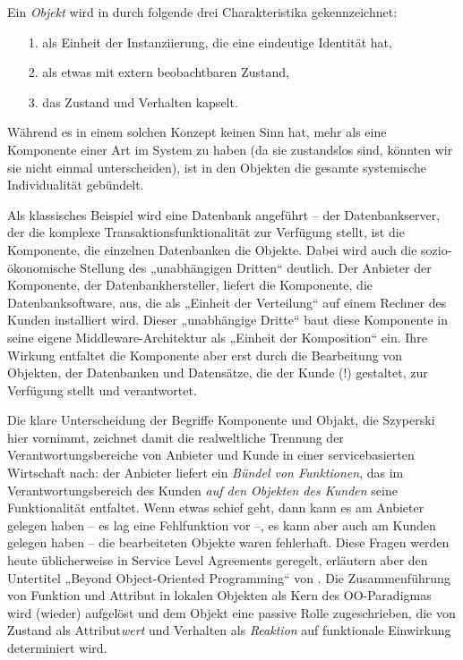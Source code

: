\documentclass[12pt,a4paper]{article}
\begin{document}
Ein \emph{Objekt} wird in \cite{Szyperski2002} durch folgende drei
Charakteristika gekennzeichnet:
\begin{itemize}
\item [1.] als Einheit der Instanziierung, die eine eindeutige Identität hat, 
\item [2.] als etwas mit extern beobachtbaren Zustand,
\item [3.] das Zustand und Verhalten kapselt.
\end{itemize}
Während es in einem solchen Konzept keinen Sinn hat, mehr als eine Komponente
einer Art im System zu haben (da sie zustandslos sind, könnten wir sie nicht
einmal unterscheiden), ist in den Objekten die gesamte systemische
Individualität gebündelt.

Als klassisches Beispiel wird eine Datenbank angeführt -- der Datenbankserver,
der die komplexe Transaktionsfunktionalität zur Verfügung stellt, ist die
Komponente, die einzelnen Datenbanken die Objekte.  Dabei wird auch die
sozio-ökonomische Stellung des „unabhängigen Dritten“ deutlich. Der Anbieter
der Komponente, der Datenbankhersteller, liefert die Komponente, die
Datenbanksoftware, aus, die als „Einheit der Verteilung“ auf einem Rechner des
Kunden installiert wird. Dieser „unabhängige Dritte“ baut diese Komponente in
seine eigene Middleware-Architektur als „Einheit der Komposition“ ein.  Ihre
Wirkung entfaltet die Komponente aber erst durch die Bearbeitung von Objekten,
der Datenbanken und Datensätze, die der Kunde (!) gestaltet, zur Verfügung
stellt und verantwortet.

Die klare Unterscheidung der Begriffe Komponente und Objakt, die Szyperski
hier vornimmt, zeichnet damit die realweltliche Trennung der
Verantwortungsbereiche von Anbieter und Kunde in einer servicebasierten
Wirtschaft nach: der Anbieter liefert ein \emph{Bündel von Funktionen}, das im
Verantwortungsbereich des Kunden \emph{auf den Objekten des Kunden} seine
Funktionalität entfaltet. Wenn etwas schief geht, dann kann es am Anbieter
gelegen haben -- es lag eine Fehlfunktion vor --, es kann aber auch am Kunden
gelegen haben -- die bearbeiteten Objekte waren fehlerhaft. Diese Fragen
werden heute üblicherweise in Service Level Agreements geregelt, erläutern
aber den Untertitel „Beyond Object-Oriented Programming“ von
\cite{Szyperski2002}.  Die Zusammenführung von Funktion und Attribut in
lokalen Objekten als Kern des OO-Paradigmas wird (wieder) aufgelöst und dem
Objekt eine passive Rolle zugeschrieben, die von Zustand als
Attribut\emph{wert} und Verhalten als \emph{Reaktion} auf funktionale
Einwirkung determiniert wird.
\end{document}
